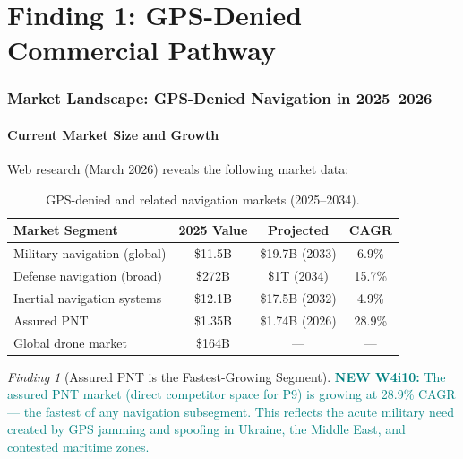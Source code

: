 \documentclass[11pt]{article}
\theoremstyle{definition}
\theoremstyle{remark}
\newtheorem{finding}[theorem]{Finding}
\newcommand{\newfinding}[1]{\textcolor{teal}{\textbf{NEW W4i10:} #1}}
\begin{document}
\part{Finding 1: GPS-Denied Commercial Pathway}
\label{part:commercial}

\section{Market Landscape: GPS-Denied Navigation in 2025--2026}
\label{sec:market}

\subsection{Current Market Size and Growth}

Web research (March 2026) reveals the following market data:

\begin{table}[H]
\centering
\caption{GPS-denied and related navigation markets (2025--2034).}
\label{tab:market-size}
\begin{tabular}{@{}p{5cm}ccc@{}}
\toprule
Market Segment & 2025 Value & Projected & CAGR \\
\midrule
Military navigation (global) & \$11.5B & \$19.7B (2033) & 6.9\% \\
Defense navigation (broad) & \$272B & \$1T (2034) & 15.7\% \\
Inertial navigation systems & \$12.1B & \$17.5B (2032) & 4.9\% \\
Assured PNT & \$1.35B & \$1.74B (2026) & 28.9\% \\
Global drone market & \$164B & --- & --- \\
\bottomrule
\end{tabular}
\end{table}

\begin{finding}[Assured PNT is the Fastest-Growing Segment]
\label{find:market-apnt}
\newfinding{The assured PNT market (direct competitor space for P9) is growing
at 28.9\% CAGR --- the fastest of any navigation subsegment. This reflects
the acute military need created by GPS jamming and spoofing in Ukraine,
the Middle East, and contested maritime zones.}
\end{finding}
\end{document}
